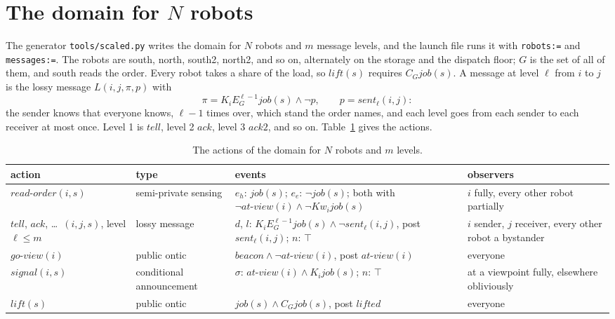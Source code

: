 \documentclass[11pt,a4paper]{article}
\theoremstyle{definition}
\newcommand{\Kop}[1]{K_{#1}}
\newcommand{\Eop}[1]{E_{#1}}
\newcommand{\Cop}[1]{C_{#1}}
\newcommand{\Kw}[1]{\mathit{Kw}_{#1}}
\newcommand{\code}[1]{\texttt{\small #1}}
\newcommand{\job}{\mathit{job}}
\newcommand{\atview}{\mathit{at\text{-}view}}
\newcommand{\sent}{\mathit{sent}}
\begin{document}
\section{The domain for $N$ robots}
\label{sec:domain}

The generator \code{tools/scaled.py} writes the domain for $N$ robots and $m$
message levels, and the launch file runs it with \code{robots:=} and
\code{messages:=}. The robots are south, north, south2, north2, and so on,
alternately on the storage and the dispatch floor; $G$ is the set of all of
them, and south reads the order. Every robot takes a share of the load, so
$\mathit{lift}(s)$ requires $\Cop{G}\job(s)$. A message at level $\ell$ from
$i$ to $j$ is the lossy message $L(i,j,\pi,p)$ with
\[
  \pi = \Kop{i}\Eop{G}^{\ell-1}\job(s) \wedge \neg p,
  \qquad p = \sent_\ell(i,j):
\]
the sender knows that everyone knows, $\ell-1$ times over, which stand the
order names, and each level goes from each sender to each receiver at most
once. Level 1 is $\mathit{tell}$, level 2 $\mathit{ack}$, level 3
$\mathit{ack2}$, and so on. Table~\ref{tab:actions} gives the actions.

\begin{table}[H]
\centering\small
\caption{The actions of the domain for $N$ robots and $m$ levels.}
\label{tab:actions}
\begin{tabularx}{\textwidth}{@{}>{\raggedright\arraybackslash}p{3.3cm} >{\raggedright\arraybackslash}p{2.5cm} >{\raggedright\arraybackslash}X >{\raggedright\arraybackslash}p{3.1cm}@{}}
\toprule
action & type & events & observers \\
\midrule
$\mathit{read\text{-}order}(i, s)$ & semi-private sensing & $e_h$: $\job(s)$; $e_e$: $\neg\job(s)$; both with $\neg\atview(i) \wedge \neg\Kw{i}\job(s)$ & $i$ fully, every other robot partially \\
$\mathit{tell}$, $\mathit{ack}$, \dots\ $(i,j,s)$, level $\ell \leq m$ & lossy message & $d$, $l$: $\Kop{i}\Eop{G}^{\ell-1}\job(s) \wedge \neg\sent_\ell(i,j)$, post $\sent_\ell(i,j)$; $n$: $\top$ & $i$ sender, $j$ receiver, every other robot a bystander \\
$\mathit{go\text{-}view}(i)$ & public ontic & $\mathit{beacon} \wedge \neg\atview(i)$, post $\atview(i)$ & everyone \\
$\mathit{signal}(i, s)$ & conditional announcement & $\sigma$: $\atview(i) \wedge \Kop{i}\job(s)$; $n$: $\top$ & at a viewpoint fully, elsewhere obliviously \\
$\mathit{lift}(s)$ & public ontic & $\job(s) \wedge \Cop{G}\job(s)$, post $\mathit{lifted}$ & everyone \\
\bottomrule
\end{tabularx}
\end{table}
\end{document}
